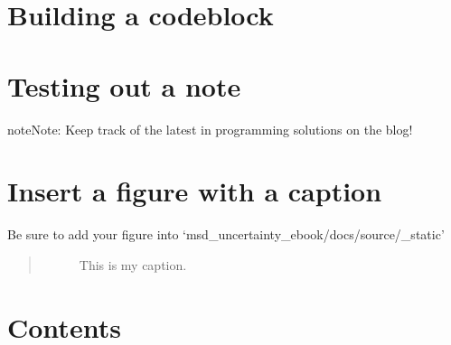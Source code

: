 \documentclass[letterpaper,10pt,english]{sphinxmanual}
\let\sphinxpxdimen\pdfpxdimen\else\newdimen\sphinxpxdimen
\begin{document}
\section{Building a codeblock}
\label{\detokenize{index:building-a-codeblock}}
\begin{sphinxVerbatim}[commandchars=\\\{\},numbers=left,firstnumber=1,stepnumber=1]
  

\end{sphinxVerbatim}


\section{Testing out a note}
\label{\detokenize{index:testing-out-a-note}}
\begin{sphinxadmonition}{note}{Note:}
\sphinxAtStartPar
Keep track of the latest in programming solutions on the  blog!
\end{sphinxadmonition}


\section{Insert a figure with a caption}
\label{\detokenize{index:insert-a-figure-with-a-caption}}
\sphinxAtStartPar
Be sure to add your figure into ‘msd\_uncertainty\_ebook/docs/source/\_static’
\begin{quote}

\begin{figure}[htbp]
\centering
\capstart

\noindent\sphinxincludegraphics[width=100\sphinxpxdimen]{{im3}.png}
\caption{This is my caption.}\label{\detokenize{index:id1}}\end{figure}
\end{quote}


\section{Contents}
\label{\detokenize{index:contents}}
\end{document}

